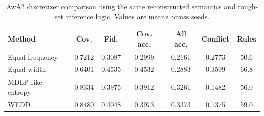\begin{table}[H]
\caption{AwA2 discretizer comparison using the same reconstructed semantics and rough-set inference logic. Values are means across seeds.\label{tab:discretizer_comparison_main}}
\centering
\small
\begin{tabular}{lcccccc}
\toprule
Method & Cov. & Fid. & Cov. acc. & All acc. & Conflict & Rules \\
\midrule
Equal frequency & 0.7212 & 0.3087 & 0.2999 & 0.2161 & 0.2773 & 50.6 \\
Equal width & 0.6401 & 0.4535 & 0.4532 & 0.2883 & 0.3599 & 66.8 \\
MDLP-like entropy & 0.8334 & 0.3975 & 0.3912 & 0.3261 & 0.1482 & 56.0 \\
WEDD & 0.8480 & 0.4048 & 0.3973 & 0.3373 & 0.1375 & 59.0 \\
\bottomrule
\end{tabular}
\end{table}
